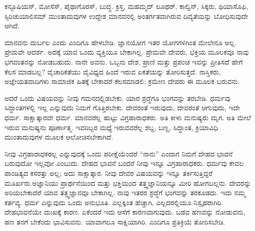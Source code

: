 ಕನ್ಫೂಷಿಯಸ್​, ಮೋಸೆಸ್​, ಪೈಥಾಗೊರಸ್​, ಬುದ್ಧ. ಕ್ರಿಸ್ತ, ಮಹಮ್ಮದ್​ ಲೂಥರ್​, ಕಾಲ್ವಿನ್​, ಸಿಕ್ಕರು, ಥಿಯಾಸೊಫಿ, ಸ್ಪಿರಿಚುಯಾಲಿಸಮ್​ ಮುಂತಾದುವುಗಳ ಉದ್ದೇಶ ಮಾನವನಲ್ಲಿ ಅಂತರ್ಗತವಾಗಿರುವ ದಿವ್ಯತೆಯನ್ನು ಬೋಧಿಸುವುದೇ ಆಗಿದೆ.

\eject

ಮಾನವನು ದುರ್ಬಲ ಎಂದು ಎಂದಿಗೂ ಹೇಳಬೇಡಿ. ಜ್ಞಾನಯೋಗ ಇತರ ಯೋಗಗಳಿಗಿಂತ ಮೇಲೇನೂ ಅಲ್ಲ. ಪ್ರೇಮವೇ ಆದರ್ಶ. ಅದಕ್ಕೆ ಯಾವ ಒಂದು ವ್ಯಕ್ತಿಯೂ ಬೇಕಾಗಿಲ್ಲ. ಪ್ರೇಮವೇ ದೇವರು, ಭಕ್ತಿಯ ಮೂಲಕವೂ ನಾವು ಭಗವಂತನನ್ನು ನೋಡಬಹುದು. ನಾನೇ ಅವನು. ಒಬ್ಬನು ದೇಶ, ಪ್ರಾಣಿ ಮತ್ತು ಪ್ರಪಂಚ ಇವನ್ನು ಪ್ರೀತಿಸದೆ ಹೇಗೆ ಕೆಲಸ ಮಾಡಬಲ್ಲ? ವೈಚಾರಿಕತೆಯು ವೈವಿಧ್ಯದ ಹಿಂದೆ ಇರುವ ಏಕತೆಯನ್ನು ತೋರಿಸುತ್ತದೆ. ನಾಸ್ತಿಕರು, ಅಜ್ಞೇಯತವಾದಿಗಳು ಸಾಮಾಜಿಕ ಹಿತಕ್ಕೆ ಬೇಕಾದರೆ ಕೆಲಸಮಾಡಲಿ; ಕ್ರಮೇಣ ದೇವರು ಈ ಮೂಲಕ ಬರುವನು.

ಆದರೆ ಒಂದು ವಿಷಯವನ್ನು ನೀವು ಗಮನದಲ್ಲಿಡಬೇಕು. ಯಾರ ಶ್ರದ್ಧೆಗೂ ಭಂಗವನ್ನು ತರಬೇಡಿ. ಧರ್ಮವು ಸಿದ್ಧಾಂತಗಳಲ್ಲಿ ಇಲ್ಲ ಎನ್ನುವುದು ನಿಮಗೆ ಗೊತ್ತಿರಬೇಕು. ದೇವರಂತೆ ಇರುವುದು, ದೇವರಂತೆ ಆಗುವುದು, ಇದೇ ಧರ್ಮ. ಸಾಕ್ಷಾತ್ಕಾರವೇ ಧರ್ಮ. ಮಾನವರೆಲ್ಲ ಹುಟ್ಟು ವಿಗ್ರಹಾರಾಧಕರು. ಅತಿ ಕೀಳು ಮನುಷ್ಯರು ಮೃಗ. ಅತಿ ಮೇಲೆ ಇರುವ ಮನುಷ್ಯನು ಪೂರ್ಣಾತ್ಮ. ಇವರಿಬ್ಬರ ಮಧ್ಯೆ ಇರುವವರೆಲ್ಲ ಶಬ್ದ, ಬಣ್ಣ, ಸಿದ್ಧಾಂತ, ಕ್ರಿಯಾವಿಧಿ ಮುಂತಾದುವುಗಳ ಮೂಲಕ ಆಲೋಚಿಸಬೇಕಾಗಿದೆ.

ನೀವು ವಿಗ್ರಹಾರಾಧಕರಲ್ಲ ಎನ್ನುವುದಕ್ಕೆ ಒಂದು ಪರೀಕ್ಷೆಯೆಂದರೆ “ನಾನು” ಎಂದಾಗ ನಿಮಗೆ ದೇಹದ ಭಾವನೆ ಬರುವುದೋ ಇಲ್ಲವೋ ಎಂಬುದು. ದೇಹದ ಭಾವನೆ ಬಂದರೆ ನೀವು ಇನ್ನೂ ವಿಗ್ರಹಾರಾಧಕರು. ಧರ್ಮವು ಕೇವಲ ಪಾಂಡಿತ್ಯದ ಕಸರತ್ತು ಅಲ್ಲ; ಅದು ಸಾಕ್ಷಾತ್ಕಾರ. ನೀವು ದೇವರ ವಿಷಯವನ್ನು ಇನ್ನೂ ತರ್ಕಿಸುತ್ತಿದ್ದರೆ ಮೂರ್ಖರು.\break ಅಜ್ಞಾನಿಯು ಪ್ರಾರ್ಥನೆಯಿಂದ ಮತ್ತು ಭಕ್ತಿಯಿಂದ ತತ್ತ್ವಜ್ಞಾನಿಯನ್ನೂ ಮೀರಿ ಹೋಗಬಲ್ಲನು. ದೇವರನ್ನು ಅರಿಯಬೇಕಾದರೆ ಯಾವ ತತ್ತ್ವಜ್ಞಾನವೂ ಬೇಕಾಗಿಲ್ಲ. ನಾವು ಇತರರ ಶ್ರದ್ಧೆಗೆ ಭಂಗವನ್ನು ತರಕೂಡದು. ಇದು ನಮ್ಮ ಕರ್ತವ್ಯ. ಧರ್ಮ ಎನ್ನುವುದು ಒಂದು ಅನುಭೂತಿ. ಎಲ್ಲಕ್ಕಿಂತ ಹೆಚ್ಚಾಗಿ, ಎಲ್ಲದರಲ್ಲಿಯೂ ನಿಸ್ಪೃಹರಾಗಿರಿ. ದೇಹಭಾವನೆಯೇ ದುಃಖಕ್ಕೆ ಕಾರಣ. ಏಕೆಂದರೆ ಇದು ಆಸೆಗೆ ಕಾರಣವಾಗುವುದು. ಬಡವ ಹಣವನ್ನು ನೋಡುವನು, ಹಣ ತನಗೆ ಬೇಕೆಂದು ಭಾವಿಸುವನು. ಯಾವಾಗಲೂ ಸಾಕ್ಷಿಯಾಗಿರಿ. ಎಂದಿಗೂ ಪ್ರತಿಕ್ರಿಯೆ ತೋರಿಸಬೇಡಿ.

